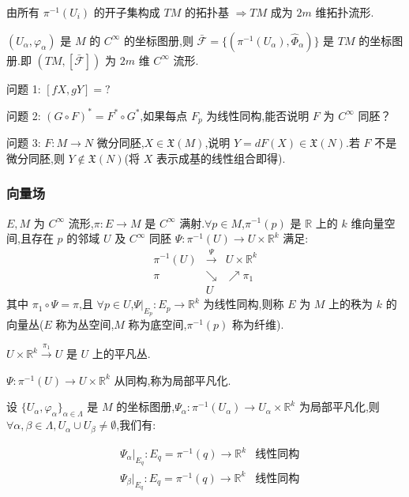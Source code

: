 由所有 $\pi^{-1}(U_i)$ 的开子集构成 $TM$ 的拓扑基 $\Rightarrow TM$ 成为 $2m$ 维拓扑流形.

$(U_\alpha, \varphi_\alpha)$ 是 $M$ 的 $C^\infty$ 的坐标图册,则 $\bar{\mathcal{F}} = \{(\pi^{-1}(U_\alpha), \hat{\Phi}_\alpha)\}$ 是 $TM$ 的坐标图册.即 $(TM,[\bar{\mathcal{F}}])$ 为 $2m$ 维 $C^\infty$ 流形.

问题 1: $[fX, gY] = ?$

问题 2: $(G \circ F)^* = F^* \circ G^*$,如果每点 $F_p$ 为线性同构,能否说明 $F$ 为 $C^\infty$ 同胚？

问题 3: $F : M \rightarrow N$ 微分同胚,$X \in \mathfrak{X}(M)$,说明 $Y = dF(X) \in \mathfrak{X}(N)$.若 $F$ 不是微分同胚,则 $Y \notin \mathfrak{X}(N)$(将 $X$ 表示成基的线性组合即得).

\subsubsection{向量场}

\begin{definition}
$E, M$ 为 $C^\infty$ 流形,$\pi : E \to M$ 是 $C^\infty$ 满射.$\forall p \in M$,$\pi^{-1}(p)$ 是 $\mathbb{R}$ 上的 $k$ 维向量空间,且存在 $p$ 的邻域 $U$ 及 $C^\infty$ 同胚 $\Psi : \pi^{-1}(U) \to U \times \mathbb{R}^k$ 满足:
\[
\begin{array}{ccc}
\pi^{-1}(U) & \xrightarrow{\Psi} & U \times \mathbb{R}^k \\
\pi & \searrow & \nearrow \pi_1 \\
& U
\end{array}
\]
其中 $\pi_1 \circ \Psi = \pi$,且 $\forall p \in U$,$\Psi|_{E_p} : E_p \to \mathbb{R}^k$ 为线性同构,则称 $E$ 为 $M$ 上的秩为 $k$ 的向量丛($E$ 称为丛空间,$M$ 称为底空间,$\pi^{-1}(p)$ 称为纤维).
\end{definition}

$U \times \mathbb{R}^k \xrightarrow{\pi_1} U$ 是 $U$ 上的平凡丛.

$\Psi : \pi^{-1}(U) \to U \times \mathbb{R}^k$ 从同构,称为局部平凡化.

设 $\{U_\alpha, \varphi_\alpha\}_{\alpha \in \Lambda}$ 是 $M$ 的坐标图册,$\Psi_\alpha : \pi^{-1}(U_\alpha) \to U_\alpha \times \mathbb{R}^k$ 为局部平凡化,则 $\forall \alpha, \beta \in \Lambda, U_\alpha \cup U_\beta \neq \emptyset$,我们有:

\[
\begin{aligned}
&\Psi_\alpha |_{E_q} : E_q = \pi^{-1}(q) \to \mathbb{R}^k & \text{线性同构} \\
&\Psi_\beta |_{E_q} : E_q = \pi^{-1}(q) \to \mathbb{R}^k & \text{线性同构}
\end{aligned}
\]

